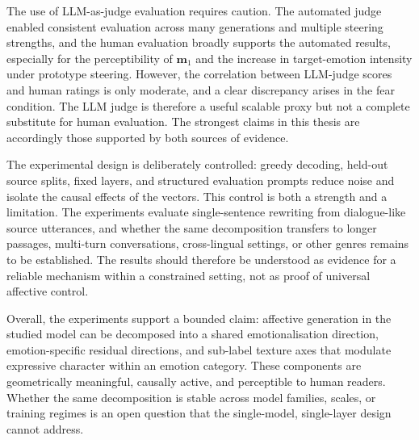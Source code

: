 The use of LLM-as-judge evaluation requires caution. The automated judge enabled consistent evaluation across many generations and multiple steering strengths, and the human evaluation broadly supports the automated results, especially for the perceptibility of $\mathbf{m}_1$ and the increase in target-emotion intensity under prototype steering. However, the correlation between LLM-judge scores and human ratings is only moderate, and a clear discrepancy arises in the fear condition. The LLM judge is therefore a useful scalable proxy but not a complete substitute for human evaluation. The strongest claims in this thesis are accordingly those supported by both sources of evidence.\par

The experimental design is deliberately controlled: greedy decoding, held-out source splits, fixed layers, and structured evaluation prompts reduce noise and isolate the causal effects of the vectors. This control is both a strength and a limitation. The experiments evaluate single-sentence rewriting from dialogue-like source utterances, and whether the same decomposition transfers to longer passages, multi-turn conversations, cross-lingual settings, or other genres remains to be established. The results should therefore be understood as evidence for a reliable mechanism within a constrained setting, not as proof of universal affective control.\par

Overall, the experiments support a bounded claim: affective generation in the studied model can be decomposed into a shared emotionalisation direction, emotion-specific residual directions, and sub-label texture axes that modulate expressive character within an emotion category. These components are geometrically meaningful, causally active, and perceptible to human readers. Whether the same decomposition is stable across model families, scales, or training regimes is an open question that the single-model, single-layer design cannot address.\par
